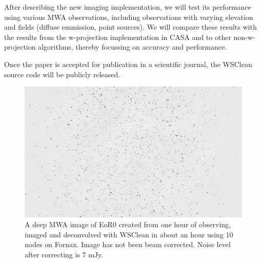 \documentclass[a4paper,10pt]{article}
\begin{document}
After describing the new imaging implementation, we will test its performance using various MWA observations, including observations with varying elevation and fields (diffuse emmission, point sources). We will compare these results with the results from the w-projection implementation in CASA and to other non-w-projection algorithms, thereby focussing on accuracy and performance.

Once the paper is accepted for publication in a scientific journal, the WSClean source code will be publicly released.

\begin{figure}[bh]
\begin{center}
\includegraphics[width=12cm]{EoR0-apparent.png}
\caption{A deep MWA image of EoR0 created from one hour of observing, imaged and deconvolved with WSClean in about an hour using 10 nodes on Fornax. Image has not been beam corrected. Noise level after correcting is 7 mJy.}
\label{fig:stddev-spectrum}
\end{center}
\end{figure}

\label{lastpage}



\end{document}
